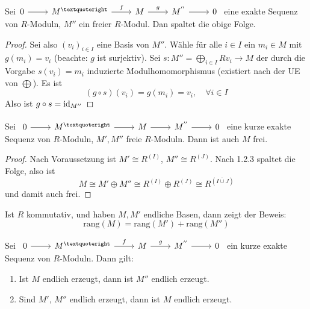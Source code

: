 \begin{sa}\label{sa2.3}
	Sei$\begin{tikzcd}
	0  \arrow{r} & M^{’} \arrow{r}{f} & M \arrow{r}{g} & M^{''} \arrow{r} & 0
	\end{tikzcd} $ eine exakte Sequenz von $R$-Moduln, $M''$ ein freier $R$-Modul. Dan spaltet die obige Folge.
\end{sa}
\begin{proof}
	Sei also $(v_i)_{i\in I}$ eine Basis von $M''$. Wähle für alle $i\in I$ ein $m_i\in M$ mit $g(m_i) = v_i$ (beachte: $g$ ist surjektiv). Sei $s:M'' = \bigoplus_{i\in I} Rv_i \to M$ der durch die Vorgabe $s(v_i) = m_i$ induzierte Modulhomomorphismus (existiert nach der UE von $\bigoplus$). Es ist 
	$$(g\circ s) (v_i) = g(m_i) = v_i, \quad \forall i\in I$$
	Also ist $g\circ s = \operatorname{id}_{M''}$
\end{proof}
\begin{fo}\label{fo2.4}
	Sei $\begin{tikzcd}
	0  \arrow{r} & M^{’} \arrow{r} & M \arrow{r} & M^{''} \arrow{r} & 0
	\end{tikzcd} $ eine kurze exakte Sequenz von $R$-Moduln, $M', M''$ freie $R$-Moduln. Dann ist auch $M$ frei.
\end{fo}
\begin{proof}
	Nach Voraussetzung ist $M' \cong R^{(I)}$, $M'' \cong R^{(J)}$. Nach 1.2.3 spaltet die Folge, also ist 
	$$M  \cong M'\oplus M'' \cong R^{(I)} \oplus R^{(J)} \cong R^{(I \overset{\cdot}{\cup} J)}$$ und damit auch frei.
\end{proof}
\begin{anm}
	Ist $R$ kommutativ, und haben $M,M'$ endliche Basen, dann zeigt der Beweis: 
	$$\text{rang}(M) = \text{rang}(M') + \text{rang}(M'')$$
\end{anm}
\begin{bem}\label{bem2.5}
	Sei $\begin{tikzcd}
	0  \arrow{r} & M^{’} \arrow{r}{f} & M \arrow{r}{g} & M^{''} \arrow{r} & 0
	\end{tikzcd} $ ein kurze exakte Sequenz von $R$-Moduln. Dann gilt: 
	\begin{enumerate}[label= \alph*)]
		\item Ist $M$ endlich erzeugt, dann ist $M''$ endlich erzeugt.
		\item Sind $M', \, M''$ endlich erzeugt, dann ist $M$ endlich erzeugt.
	\end{enumerate}
\end{bem}
